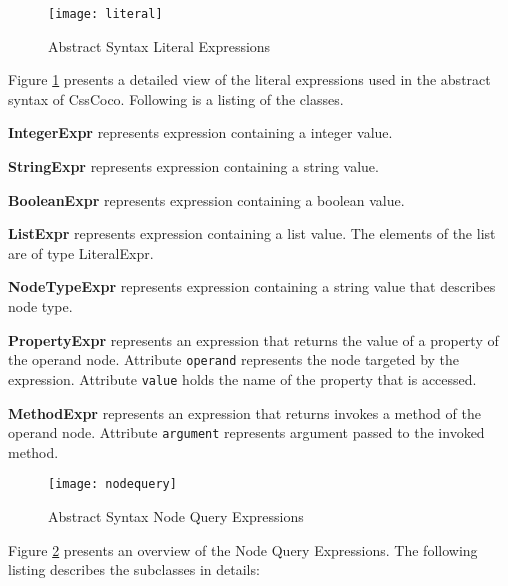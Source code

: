 \documentclass[parskip=full]{uvamscse}
\begin{document}
\begin{figure}[h!]
  \centering
  \caption{Abstract Syntax Literal Expressions}
  \label{fig:literal}
  \texttt{[image: literal]}
\end{figure}

Figure \ref{fig:literal} presents a detailed view of the literal expressions used in the abstract syntax of CssCoco. Following is a listing of the classes. 

\begin{description}

\item\textbf{IntegerExpr} represents expression containing a integer value.

\item\textbf{StringExpr} represents expression containing a string value.

\item\textbf{BooleanExpr} represents expression containing a boolean value.

\item\textbf{ListExpr} represents expression containing a list value. The elements of the list are of type LiteralExpr.

\item\textbf{NodeTypeExpr} represents expression containing a string value that describes node type.

\item\textbf{PropertyExpr} represents an expression that returns the value of a property of the operand node. Attribute \texttt{operand} represents the node targeted by the expression. Attribute \texttt{value} holds the name of the property that is accessed.

\item\textbf{MethodExpr} represents an expression that returns invokes a method of the operand node. Attribute \texttt{argument} represents argument passed to the invoked method.

\end{description}

\begin{figure}[h!]
  \centering
  \caption{Abstract Syntax Node Query Expressions}
  \label{fig:nodequery}
  \texttt{[image: nodequery]}
\end{figure}

Figure \ref{fig:nodequery} presents an overview of the Node Query Expressions. The following listing describes the subclasses in details:
\end{document}
